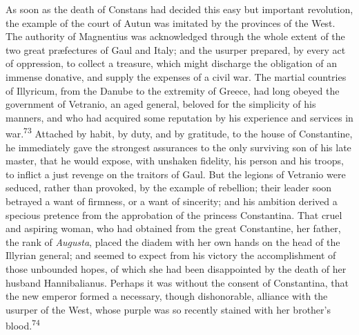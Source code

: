 As soon as the death of Constans had decided this easy but
important revolution, the example of the court of Autun was
imitated by the provinces of the West. The authority of
Magnentius was acknowledged through the whole extent of the two
great præfectures of Gaul and Italy; and the usurper prepared, by
every act of oppression, to collect a treasure, which might
discharge the obligation of an immense donative, and supply the
expenses of a civil war. The martial countries of Illyricum, from
the Danube to the extremity of Greece, had long obeyed the
government of Vetranio, an aged general, beloved for the
simplicity of his manners, and who had acquired some reputation
by his experience and services in war.\textsuperscript{73} Attached by habit, by
duty, and by gratitude, to the house of Constantine, he
immediately gave the strongest assurances to the only surviving
son of his late master, that he would expose, with unshaken
fidelity, his person and his troops, to inflict a just revenge on
the traitors of Gaul. But the legions of Vetranio were seduced,
rather than provoked, by the example of rebellion; their leader
soon betrayed a want of firmness, or a want of sincerity; and his
ambition derived a specious pretence from the approbation of the
princess Constantina. That cruel and aspiring woman, who had
obtained from the great Constantine, her father, the rank of
\textit{Augusta}, placed the diadem with her own hands on the head of
the Illyrian general; and seemed to expect from his victory the
accomplishment of those unbounded hopes, of which she had been
disappointed by the death of her husband Hannibalianus. Perhaps
it was without the consent of Constantina, that the new emperor
formed a necessary, though dishonorable, alliance with the
usurper of the West, whose purple was so recently stained with
her brother’s blood.\textsuperscript{74}



